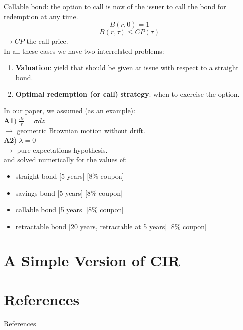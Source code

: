 \documentclass[
14pt,notheorems,hyperref={pdfauthor=whatever}
]{beamer}
\begin{document}
\begin{frame}
\underline{Callable bond}: the option to call is now of the issuer to call the bond for redemption at any time.\\
\[ B(r,0) = 1 \]
\[ B(r,\tau) \leq CP(\tau) \]
$\longrightarrow CP$ the call price.\\
\hfill\break
In all these cases we have two interrelated problems:\\
\begin{enumerate}
    \item \textbf{Valuation}: yield that should be given at issue with respect to a straight bond.
    \item \textbf{Optimal redemption (or call) strategy}: when to exercise the option.
\end{enumerate}
\end{frame}

\begin{frame}
In our paper, we assumed (as an example):\\
\hfill\break
\textbf{A1}) $\frac{dr}{r} = \sigma dz$\\
$\longrightarrow$ geometric Brownian motion without drift.\\
\hfill\break
\textbf{A2}) $\lambda = 0$\\
$\longrightarrow$ pure expectations hypothesis.\\
\hfill\break
and solved numerically for the values of:
\begin{itemize}
    \item straight bond [5 years] [8\% coupon]
    \item savings bond [5 years] [8\% coupon]
    \item callable bond [5 years] [8\% coupon]
    \item retractable bond [20 years, retractable at 5 years] [8\% coupon]
\end{itemize}
\end{frame}

\section{A Simple Version of CIR}

\section*{References}
\begin{frame}[allowframebreaks]{References}
    \printbibliography
\end{frame}
\end{document}
